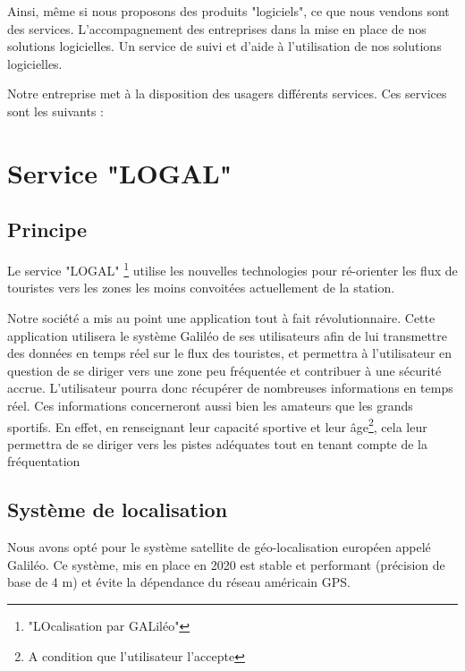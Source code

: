 Ainsi, même si nous proposons des produits "logiciels", ce que nous vendons sont des services. L'accompagnement des entreprises dans la mise en place de nos solutions logicielles.
Un service de suivi et d'aide à l'utilisation de nos solutions logicielles.



Notre entreprise met à la disposition des usagers différents services. Ces services sont les suivants :

\section{Service "LOGAL"}

\subsection{Principe}

Le service "LOGAL" \footnote{"LOcalisation par GALiléo"} utilise les nouvelles technologies pour ré-orienter les flux de touristes vers les zones les moins convoitées actuellement de la station. \newline


Notre société a mis au point une application tout à fait révolutionnaire. Cette application utilisera le système Galiléo de ses utilisateurs afin de lui transmettre des données en temps réel sur le flux des touristes, et permettra à l’utilisateur en question de se diriger vers une zone peu fréquentée et contribuer à une sécurité accrue.\n
L'utilisateur pourra donc récupérer de nombreuses informations en temps réel. Ces informations concerneront aussi bien les amateurs que les grands sportifs.
En effet, en renseignant leur capacité sportive et leur âge\footnote{A condition que l'utilisateur l'accepte}, cela leur permettra de se diriger vers les pistes adéquates tout en tenant compte de la fréquentation




\newpage



\subsection{Système de localisation}

Nous avons opté pour le système satellite de géo-localisation européen appelé Galiléo. \newline 
Ce système, mis en place en 2020 est stable et performant (précision de base de 4 m) et évite la dépendance du réseau américain GPS.

